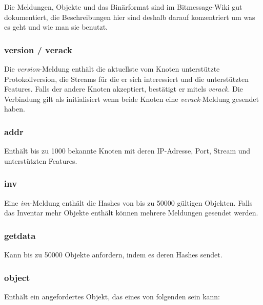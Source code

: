 \documentclass{bfh}
\newcommand{\msg}[1]{\textit{\textcolor{RedOrange}{#1}}}
\begin{document}
  Die Meldungen, Objekte und das Binärformat sind im Bitmessage-Wiki gut dokumentiert\cite{wiki:protocol}, die Beschreibungen hier sind deshalb darauf konzentriert um was es geht und wie man sie benutzt.

  \subsubsection{version / verack}
  Die \msg{version}-Meldung enthält die aktuellste vom Knoten unterstützte Protokollversion, die Streams für die er sich interessiert und die unterstützten Features. Falls der andere Knoten akzeptiert, bestätigt er mitels \msg{verack}. Die Verbindung gilt als initialisiert wenn beide Knoten eine \msg{verack}-Meldung gesendet haben.

  \subsubsection{addr}
  Enthält bis zu 1000 bekannte Knoten mit deren IP-Adresse, Port, Stream und unterstützten Features.

  \subsubsection{inv}
  Eine \msg{inv}-Meldung enthält die Hashes von bis zu 50000 gültigen Objekten. Falls das Inventar mehr Objekte enthält können mehrere Meldungen gesendet werden.

  \subsubsection{getdata}
  Kann bis zu 50000 Objekte anfordern, indem es deren Hashes sendet.

  \subsubsection{object}
  Enthält ein angefordertes Objekt, das eines von folgenden sein kann:

\end{document}
